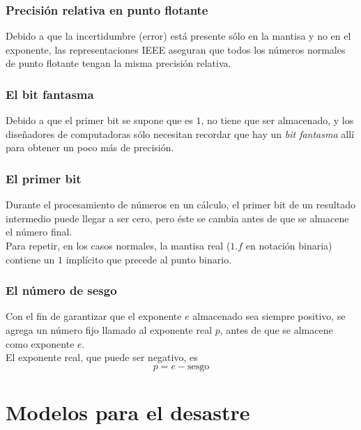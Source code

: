 \begin{frame}
\frametitle{Precisión relativa en punto flotante}
Debido a que la incertidumbre (error) está presente sólo en la mantisa y no en el exponente, las representaciones IEEE aseguran que todos los números normales de punto flotante tengan la misma precisión relativa.
\end{frame}
\begin{frame}
\frametitle{El bit fantasma}
Debido a que el primer bit se supone que es $1$, no tiene que ser almacenado, y los diseñadores de computadoras sólo necesitan recordar que hay un \emph{bit fantasma} allí para obtener un poco más de precisión.
\end{frame}
\begin{frame}
\frametitle{El primer bit}
Durante el procesamiento de números en un cálculo, el primer bit de un resultado intermedio puede llegar a ser cero, pero éste se cambia antes de que se almacene el número final.
\\
\bigskip
Para repetir, en los casos normales, la mantisa real ($1.f$ en notación binaria) contiene un $1$ implícito que precede al punto binario.
\end{frame}
\begin{frame}
\frametitle{El número de sesgo}
Con el fin de garantizar que el exponente $e$ almacenado sea siempre positivo, se agrega un número fijo llamado  al exponente real $p$, antes de que se almacene como exponente $e$.
\\
\bigskip
El exponente real, que puede ser negativo, es
\begin{equation}
p = e - \text{sesgo}
\label{eq:ecuacion_01_03}
\end{equation}
\end{frame}
\section{Modelos para el desastre}
